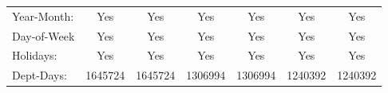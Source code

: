 {\begin{tabular}{l*{6}{c}}
Year-Month: &         Yes         &         Yes         &         Yes         &         Yes         &         Yes         &         Yes         \\
Day-of-Week &         Yes         &         Yes         &         Yes         &         Yes         &         Yes         &         Yes         \\
Holidays:   &         Yes         &         Yes         &         Yes         &         Yes         &         Yes         &         Yes         \\
Dept-Days:  &     1645724         &     1645724         &     1306994         &     1306994         &     1240392         &     1240392         \\
\hline \end{tabular}}
